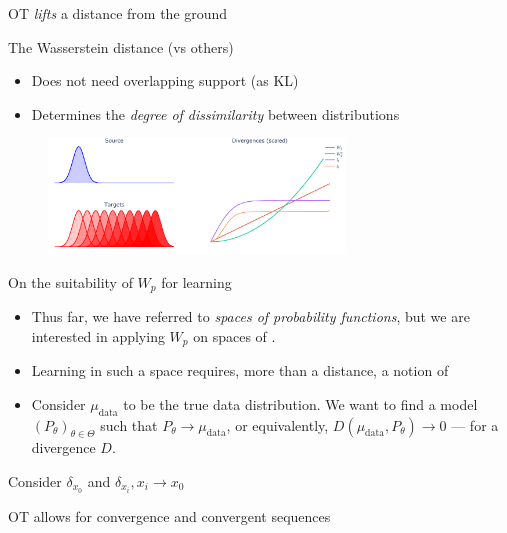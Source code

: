 \documentclass[pdf,aspectratio=169,10pt]{beamer}
\begin{document}
\begin{frame}{OT \emph{lifts} a distance from the ground}
\end{frame}

\begin{frame}{The Wasserstein distance (vs others)}
    \begin{itemize}
        \item Does not need overlapping support (as KL)
        \item Determines the \emph{degree of dissimilarity} between distributions
    \end{itemize}
    \begin{figure}
        \centering
            \includegraphics[trim={0 0 0 0},clip, width=0.7\textwidth]{../img/wasserstein_1d.pdf}
        \end{figure}
        \centering
        \small

\end{frame}

\begin{frame}{On the suitability of $W_p$ for learning}

\begin{itemize}
    \item Thus far, we have referred to \emph{spaces of probability functions}, but we are interested in applying $W_p$ on spaces of .
    \item Learning in such a space requires, more than a distance, a notion of 
    \item Consider $\mu_\text{data}$ to be the true data distribution. We want to find a model $(P_\theta)_{\theta\in\Theta}$ such that $P_\theta \to \mu_\text{data}$, or equivalently, $D(\mu_\text{data},P_\theta)\to 0$ --- for a  divergence $D$.
\end{itemize}
\vspace{2em}
\centerline{ Consider $\delta_{x_0}$ and $\delta_{x_i}, x_i\to x_0$}
\vspace{2em}

\centerline{OT allows for  convergence and  convergent sequences}

\end{frame}
\end{document}
